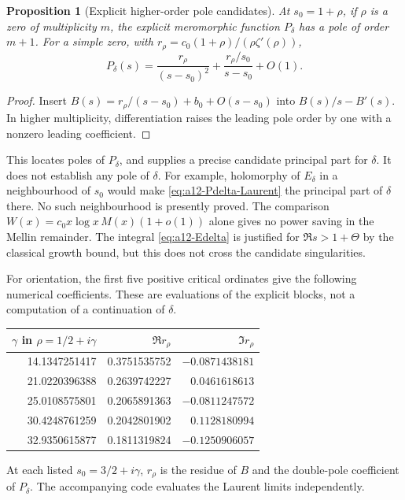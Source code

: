 \documentclass[11pt]{amsart}
\numberwithin{equation}{section}
\theoremstyle{plain}
\newtheorem{proposition}[theorem]{Proposition}
\theoremstyle{definition}
\theoremstyle{remark}
\begin{document}
\begin{proposition}[Explicit higher-order pole candidates]
\label{prop:a12-Pdelta}
At $s_0=1+\rho$, if $\rho$ is a zero of multiplicity $m$, the explicit
meromorphic function $P_\delta$ has a pole of order $m+1$.
For a simple zero, with
$r_\rho=c_0(1+\rho)/(\rho\zeta'(\rho))$,
\begin{equation}
\label{eq:a12-Pdelta-Laurent}
P_\delta(s)=
\frac{r_\rho}{(s-s_0)^2}
+\frac{r_\rho/s_0}{s-s_0}+O(1).
\end{equation}
\end{proposition}
\begin{proof}
Insert $B(s)=r_\rho/(s-s_0)+b_0+O(s-s_0)$ into
$B(s)/s-B'(s)$. In higher multiplicity, differentiation raises the
leading pole order by one with a nonzero leading coefficient.
\end{proof}

This locates poles of $P_\delta$, and supplies a precise candidate
principal part for $\delta$. It does not establish any pole of $\delta$.
For example, holomorphy of $E_\delta$ in a neighbourhood of $s_0$ would
make \eqref{eq:a12-Pdelta-Laurent} the principal part of $\delta$ there.
No such neighbourhood is presently proved. The comparison
$W(x)=c_0x\log x\,M(x)(1+o(1))$ alone gives no power saving in the
Mellin remainder. The integral \eqref{eq:a12-Edelta} is justified for
$\Re s>1+\Theta$ by the classical growth bound, but this does not cross
the candidate singularities.

For orientation, the first five positive critical ordinates give the
following numerical coefficients. These are evaluations of the explicit
blocks, not a computation of a continuation of $\delta$.
\begin{center}
\small
\begin{tabular}{rrr}
\toprule
$\gamma$ in $\rho=1/2+i\gamma$&
$\Re r_\rho$&$\Im r_\rho$\\
\midrule
14.1347251417&0.3751535752&$-0.0871438181$\\
21.0220396388&0.2639742227&$ 0.0461618613$\\
25.0108575801&0.2065891363&$-0.0811247572$\\
30.4248761259&0.2042801902&$ 0.1128180994$\\
32.9350615877&0.1811319824&$-0.1250906057$\\
\bottomrule
\end{tabular}
\end{center}
At each listed $s_0=3/2+i\gamma$, $r_\rho$ is the residue of $B$ and the
double-pole coefficient of $P_\delta$.
The accompanying code evaluates the Laurent limits independently.
\end{document}
